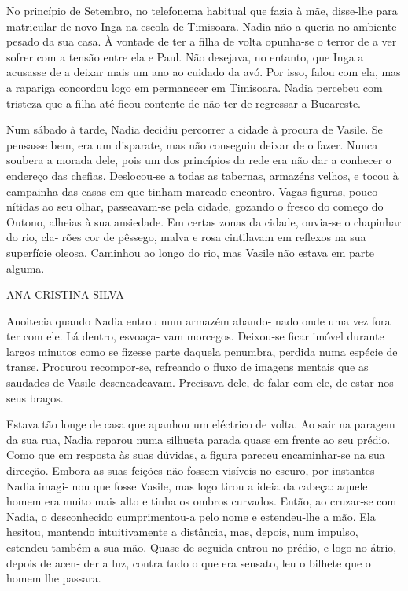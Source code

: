 No princípio de Setembro, no telefonema habitual que fazia à mãe,
disse‑lhe para matricular de novo Inga na escola de Timisoara. Nadia não
a queria no ambiente pesado da sua casa. À vontade de ter a filha de
volta opunha‑se o terror de a ver sofrer com a tensão entre ela e Paul.
Não desejava, no entanto, que Inga a acusasse de a deixar mais um ano ao
cuidado da avó. Por isso, falou com ela, mas a rapariga concordou logo
em permanecer em Timisoara. Nadia percebeu com tristeza que a filha até
ficou contente de não ter de regressar a Bucareste.

Num sábado à tarde, Nadia decidiu percorrer a cidade à procura de
Vasile. Se pensasse bem, era um disparate, mas não conseguiu deixar de o
fazer. Nunca soubera a morada dele, pois um dos princípios da rede era
não dar a conhecer o endereço das chefias. Deslocou‑se a todas as
tabernas, armazéns velhos, e tocou à campainha das casas em que tinham
marcado encontro. Vagas figuras, pouco nítidas ao seu olhar,
passeavam‑se pela cidade, gozando o fresco do começo do Outono, alheias
à sua ansiedade. Em certas zonas da cidade, ouvia‑se o chapinhar do rio,
cla‑ rões cor de pêssego, malva e rosa cintilavam em reflexos na sua
superfície oleosa. Caminhou ao longo do rio, mas Vasile não estava em
parte alguma.

ANA CRISTINA SILVA

Anoitecia quando Nadia entrou num armazém abando‑ nado onde uma vez fora
ter com ele. Lá dentro, esvoaça‑ vam morcegos. Deixou‑se ficar imóvel
durante largos minutos como se fizesse parte daquela penumbra, perdida
numa espécie de transe. Procurou recompor‑se, refreando o fluxo de
imagens mentais que as saudades de Vasile desencadeavam. Precisava dele,
de falar com ele, de estar nos seus braços.

Estava tão longe de casa que apanhou um eléctrico de volta. Ao sair na
paragem da sua rua, Nadia reparou numa silhueta parada quase em frente
ao seu prédio. Como que em resposta às suas dúvidas, a figura pareceu
encaminhar‑se na sua direcção. Embora as suas feições não fossem
visíveis no escuro, por instantes Nadia imagi‑ nou que fosse Vasile, mas
logo tirou a ideia da cabeça: aquele homem era muito mais alto e tinha
os ombros curvados. Então, ao cruzar‑se com Nadia, o desconhecido
cumprimentou‑a pelo nome e estendeu‑lhe a mão. Ela hesitou, mantendo
intuitivamente a distância, mas, depois, num impulso, estendeu também a
sua mão. Quase de seguida entrou no prédio, e logo no átrio, depois de
acen‑ der a luz, contra tudo o que era sensato, leu o bilhete que o
homem lhe passara.

